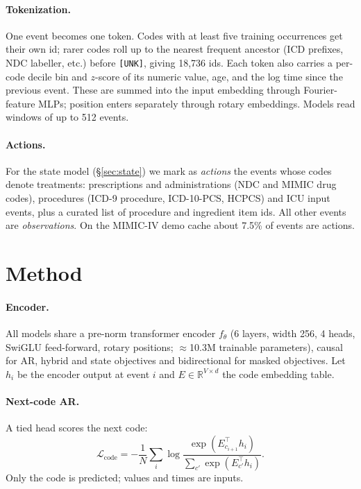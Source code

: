 \documentclass[10pt,letterpaper]{article}
\newcommand{\code}[1]{\texttt{\small #1}}
\begin{document}
\paragraph{Tokenization.}
One event becomes one token. Codes with at least five training occurrences get
their own id; rarer codes roll up to the nearest frequent ancestor (ICD
prefixes, NDC labeller, etc.) before \code{[UNK]}, giving 18{,}736 ids. Each
token also carries a per-code decile bin and $z$-score of its numeric value,
age, and the log time since the previous event. These are summed into the
input embedding through Fourier-feature MLPs; position enters separately
through rotary embeddings. Models read windows of up to 512 events.

\paragraph{Actions.}
For the state model (\S\ref{sec:state}) we mark as \emph{actions} the events
whose codes denote treatments: prescriptions and administrations (NDC and
MIMIC drug codes), procedures (ICD-9 procedure, ICD-10-PCS, HCPCS) and ICU
input events, plus a curated list of procedure and ingredient item ids. All
other events are \emph{observations}. On the MIMIC-IV demo cache about 7.5\% of
events are actions.

\section{Method}
\label{sec:method}

\paragraph{Encoder.}
All models share a pre-norm transformer encoder $f_\theta$ (6 layers, width
256, 4 heads, SwiGLU feed-forward, rotary positions; $\approx$10.3M trainable
parameters), causal for AR, hybrid and state objectives and bidirectional for
masked objectives. Let $h_i$ be the encoder output at event $i$ and
$E\in\mathbb{R}^{V\times d}$ the code embedding table.

\paragraph{Next-code AR.}
A tied head scores the next code:
\begin{equation}
\mathcal{L}_{\mathrm{code}} = -\frac{1}{N}\sum_i
\log\frac{\exp(E_{c_{i+1}}^{\top}h_i)}{\sum_{c'}\exp(E_{c'}^{\top}h_i)} .
\end{equation}
Only the code is predicted; values and times are inputs.
\end{document}
